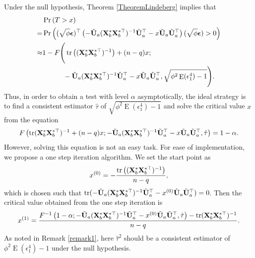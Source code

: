 \documentclass[smallextended]{svjour3}       %
\DeclareMathOperator{\mytr}{tr}
\DeclareMathOperator{\myE}{E}
\begin{document}
Under the null hypothesis, Theorem \ref{TheoremLindeberg} implies that
\begin{equation*}
    \begin{split}
    &\Pr\left( 
        T> x 
    \right) 
    \\
    =&
    \Pr\left( 
        (\sqrt \phi \bepsilon)^\top 
        \left( 
        -\tilde{\BU}_a ( \BX_b^* \BX_b^{*\top} )^{-1} \tilde{\BU}_a^\top 
   -x\tilde{\BU}_a \tilde{\BU}_a^\top
        \right)
        (\sqrt \phi \bepsilon)
        > 0
    \right) 
    \\
    \approx& 
    1- F\Bigg(
   \mytr\left( (\BX_b^* \BX_b^{*\top})^{-1} \right)
   +(n-q)x
        ;
        \\
        &\quad\quad\quad
        -\tilde{\BU}_a ( \BX_b^* \BX_b^{*\top} )^{-1} \tilde{\BU}_a^\top 
   -x\tilde{\BU}_a \tilde{\BU}_a^\top
,\sqrt{\phi^2 \myE (\epsilon_1^4) -1}\Bigg)
.
    \end{split}
\end{equation*}
Thus, in order to obtain a test with level $\alpha$ asymptotically, the ideal strategy is to find a consistent estimator $\hat \tau$ of $\sqrt{\phi^2 \myE (\epsilon_1^4) -1}$ and solve the critical value $x$ from the equation
\begin{equation*}
     F\left(
   \mytr (\BX_b^* \BX_b^{*\top})^{-1} 
   +(n-q)x
        ;-\tilde{\BU}_a ( \BX_b^* \BX_b^{*\top} )^{-1} \tilde{\BU}_a^\top 
   -x\tilde{\BU}_a \tilde{\BU}_a^\top
,\hat \tau\right)
=1-\alpha.
\end{equation*}
However, solving this equation is not an easy task.
For ease of implementation, we propose a one step iteration algorithm.
We set the start point as
\begin{equation*}
    x^{(0)} =  -\frac{\mytr \left( ( \BX_b^* \BX_b^{*\top} )^{-1} \right)}{n-q},
\end{equation*}
which is chosen such that $\mytr( -\tilde{\BU}_a ( \BX_b^* \BX_b^{*\top} )^{-1} \tilde{\BU}_a^\top 
-x^{(0)}\tilde{\BU}_a \tilde{\BU}_a^\top )=0$.
Then the critical value obtained from the one step iteration is
\begin{equation*}
    x^{(1)}= 
        \frac{
            F^{-1}\left(1-\alpha;-\tilde{\BU}_a ( \BX_b^* \BX_b^{*\top} )^{-1} \tilde{\BU}_a^\top 
                -x^{(0)}\tilde{\BU}_a \tilde{\BU}_a^\top
,\hat \tau\right)
-
   \mytr (\BX_b^* \BX_b^{*\top})^{-1} 
   }{n-q}
.
\end{equation*}
As noted in Remark \ref{remark1}, here $\hat \tau^2$ should be a consistent estimator of $\phi^2 \myE (\epsilon_1^4)-1$ under the null hypothesis.
\end{document}
